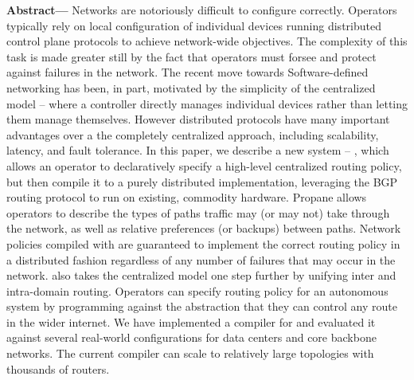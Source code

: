 \textbf{Abstract---}
Networks are notoriously difficult to configure correctly. Operators typically rely on local configuration of individual devices running distributed control plane protocols to achieve network-wide objectives. The complexity of this task is made greater still by the fact that operators must forsee and protect against failures in the network.
%
The recent move towards Software-defined networking has been, in part, motivated by the simplicity of the centralized model -- where a controller directly manages individual devices rather than letting them manage themselves. However distributed protocols have many important advantages over a the completely centralized approach, including scalability, latency, and fault tolerance.
%
In this paper, we describe a new system -- \sysname, which allows an operator to declaratively specify a high-level centralized routing policy, but then compile it to a purely distributed implementation, leveraging the BGP routing protocol to run on existing, commodity hardware. 
%
Propane allows operators to describe the types of paths traffic may (or may not) take through the network, as well as relative preferences (or backups) between paths. 
%
Network policies compiled with \sysname are guaranteed to implement the correct routing policy in a distributed fashion regardless of any number of failures that may occur in the network. 
%
\sysname also takes the centralized model one step further by unifying inter and intra-domain routing. Operators can specify routing policy for an autonomous system by programming against the abstraction that they can control any route in the wider internet.
%
We have implemented a compiler for \sysname and evaluated it against several real-world configurations for data centers and core backbone networks. The current \sysname compiler can scale to relatively large topologies with thousands of routers.